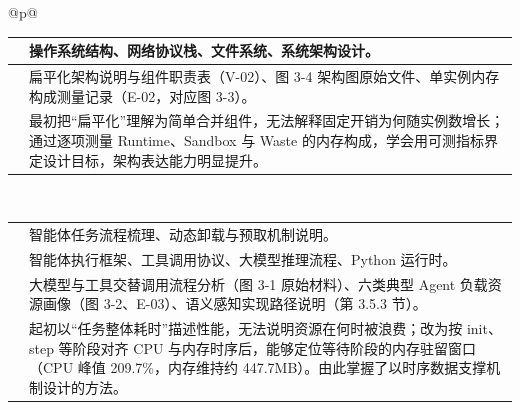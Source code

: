 \begin{longtable}{@{}p{\linewidth}@{}}
\begin{minipage}{\linewidth}
\begin{tabular}{@{}>{\raggedright\arraybackslash}p{}>{\raggedright\arraybackslash}p{}@{}}
\rowcolor{white} \TableHeaderText{使用的专业知识} & 操作系统结构、网络协议栈、文件系统、系统架构设计。 \\ \hline
\rowcolor{white} \TableHeaderText{交付成果与材料编号} & 扁平化架构说明与组件职责表（V-02）、图 3-4 架构图原始文件、单实例内存构成测量记录（E-02，对应图 3-3）。 \\ \hline
\rowcolor{white} \TableHeaderText{遇到的问题与能力提升} & 最初把“扁平化”理解为简单合并组件，无法解释固定开销为何随实例数增长；通过逐项测量 Runtime、Sandbox 与 Waste 的内存构成，学会用可测指标界定设计目标，架构表达能力明显提升。 \\ \hline
\end{tabular}
\end{minipage} \\[6pt]
\begin{minipage}{\linewidth}
\begin{tabular}{@{}>{\raggedright\arraybackslash}p{}>{\raggedright\arraybackslash}p{}@{}}
\hline
\rowcolor{WordTableHeader}\multicolumn{2}{@{}p{\linewidth}@{}}{\RecordHeading{姓名与专业：刘书雄\quad 2024 级本科\quad 人工智能}} \\ \hline
\rowcolor{white} \TableHeaderText{承担任务} & 智能体任务流程梳理、动态卸载与预取机制说明。 \\ \hline
\rowcolor{white} \TableHeaderText{使用的专业知识} & 智能体执行框架、工具调用协议、大模型推理流程、Python 运行时。 \\ \hline
\rowcolor{white} \TableHeaderText{交付成果与材料编号} & 大模型与工具交替调用流程分析（图 3-1 原始材料）、六类典型 Agent 负载资源画像（图 3-2、E-03）、语义感知实现路径说明（第 3.5.3 节）。 \\ \hline
\rowcolor{white} \TableHeaderText{遇到的问题与能力提升} & 起初以“任务整体耗时”描述性能，无法说明资源在何时被浪费；改为按 init、step 等阶段对齐 CPU 与内存时序后，能够定位等待阶段的内存驻留窗口（CPU 峰值 209.7\%，内存维持约 447.7MB）。由此掌握了以时序数据支撑机制设计的方法。 \\ \hline
\end{tabular}
\end{minipage} \\[6pt]
\begin{minipage}{\linewidth}
\begin{tabular}{@{}>{\raggedright\arraybackslash}p{}>{\raggedright\arraybackslash}p{}@{}}
\hline
\rowcolor{WordTableHeader}\multicolumn{2}{@{}p{\linewidth}@{}}{\RecordHeading{姓名与专业：李子鹏\quad 2025 级本科\quad 计算机科学与技术}} \\ \hline

\end{tabular}
\end{minipage}
\end{longtable}
